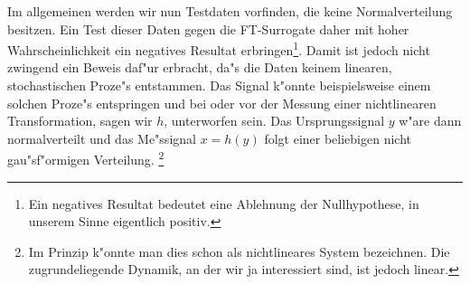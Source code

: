 Im allgemeinen werden wir nun Testdaten vorfinden, die keine Normalverteilung besitzen.
Ein Test dieser Daten gegen die FT-Surrogate daher mit hoher Wahrscheinlichkeit ein
negatives Resultat erbringen\footnote{Ein negatives Resultat bedeutet eine Ablehnung der
  Nullhypothese, in unserem Sinne eigentlich positiv.}. Damit ist jedoch nicht
zwingend ein Beweis daf"ur erbracht, da"s die Daten keinem linearen, stochastischen Proze"s
entstammen. Das Signal k"onnte beispielsweise einem solchen Proze"s entspringen und bei
oder vor der Messung einer nichtlinearen Transformation, sagen wir $h$, unterworfen sein.
Das Ursprungssignal $y$ w"are dann normalverteilt und das Me"ssignal $x=h(y)$ folgt einer
beliebigen nicht gau"sf"ormigen Verteilung. \footnote{Im Prinzip k"onnte man dies schon als
  nichtlineares System bezeichnen. Die zugrundeliegende Dynamik, an der wir ja interessiert sind, ist
  jedoch linear.}

